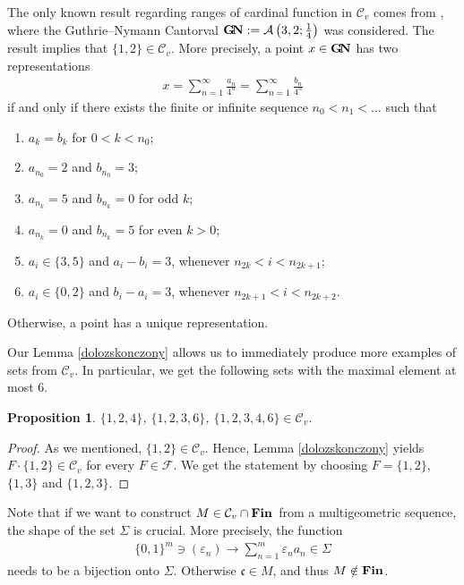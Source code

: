\documentclass{amsart}
\newtheorem{proposition}[theorem]{Proposition}
\theoremstyle{definition}
\newcommand{\Fin}{ {\rm \bf Fin} \hspace{0.03cm}}
\newcommand{\Cv}{\mathcal{C}_{v}}
\newcommand{\GN}{\mathbf{G}\hspace{-0.07cm}\mathbf{N}}
\begin{document}
The only known result regarding ranges of cardinal function in $\Cv$ comes from \cite{BPW}, where the Guthrie--Nymann Cantorval $\GN:=\mathcal{A}\left(3,2;\frac{1}{4}\right)$ was considered. The result \cite[Theorem 6.1]{BPW} implies that $\{1,2\}\in\Cv$. More precisely, a point $x\in \GN$ has two representations
\begin{align*}
x=\sum_{n=1}^{\infty}\frac{a_n}{4^n}=\sum_{n=1}^{\infty}\frac{b_n}{4^n}
\end{align*}
if and only if there exists the finite or infinite sequence $n_0<n_1<\ldots$ such that 
\begin{enumerate}
\item $a_k=b_k$ for $0<k<n_0$;
\item $a_{n_0}=2$ and $b_{n_0}=3$;
\item $a_{n_k}=5$ and $b_{n_k}=0$ for odd $k$;
\item $a_{n_k}=0$ and $b_{n_k}=5$ for even $k>0$;
\item  $a_{i}\in\{3,5\}$ and $a_i-b_{i}=3$, whenever $n_{2k}<i<n_{2k+1}$;
\item  $a_{i}\in\{0,2\}$ and $b_i-a_{i}=3$, whenever $n_{2k+1}<i<n_{2k+2}$.
\end{enumerate} 
Otherwise, a point has a unique representation.

Our Lemma \ref{dolozskonczony} allows us to immediately produce more examples of sets from $\Cv$. In particular, we get the following sets with the maximal element at most $6$.

\begin{proposition}
$\{1,2,4\}$, $\{1,2,3,6\}$, $\{1,2,3,4,6\}\in \Cv$.
\end{proposition}
\begin{proof}
As we mentioned, $\{1,2\}\in \Cv$. Hence, Lemma \ref{dolozskonczony} yields $F\cdot \{1,2\}\in \Cv$ for every $F\in\mathcal{F}$. We get the statement by choosing $F=\{1,2\}$, $\{1,3\}$ and $\{1,2,3\}$.
\end{proof}


Note that if we want to construct $M\in \Cv\cap \Fin$ from a multigeometric sequence, the shape of the set $\Sigma$ is crucial. More precisely, the function 
\begin{align*}
\{0,1\}^{m}\ni (\varepsilon_n)\rightarrow \sum_{n=1}^{m}\varepsilon_na_n\in \Sigma
\end{align*}
needs to be a bijection onto $\Sigma$. Otherwise $\mathfrak{c}\in M$, and thus $M\notin\Fin$. 


\end{document}

